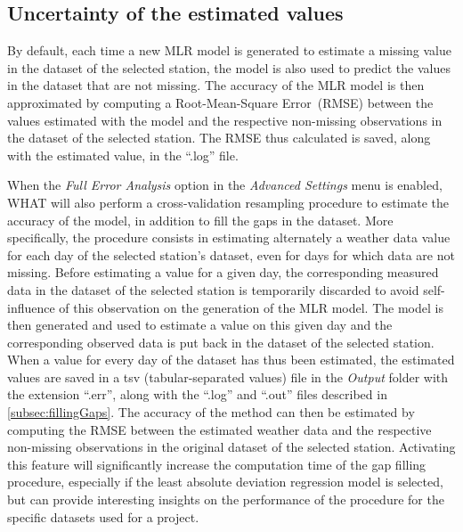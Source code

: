 \documentclass[WHATMANUAL.tex]{subfiles}
\begin{document}
\subsection{Uncertainty of the estimated values}\label{subsec:uncertainty}

By default, each time a new MLR model is generated to estimate a missing value in the dataset of the selected station, the model is also used to predict the values in the dataset that are not missing. The accuracy of the MLR model is then approximated by computing a Root-Mean-Square Error~(RMSE) between the values estimated with the model and the respective non-missing observations in the dataset of the selected station. The RMSE thus calculated is saved, along with the estimated value, in the ``.log'' file.

When the \emph{Full Error Analysis} option in the \emph{Advanced Settings} menu is enabled, WHAT will also perform a cross-validation resampling procedure to estimate the accuracy of the model, in addition to fill the gaps in the dataset. More specifically, the procedure consists in estimating alternately a weather data value for each day of the selected station's dataset, even for days for which data are not missing. Before estimating a value for a given day, the corresponding measured data in the dataset of the selected station is temporarily discarded to avoid self-influence of this observation on the generation of the MLR model. The model is then generated and used to estimate a value on this given day and the corresponding observed data is put back in the dataset of the selected station. When a value for every day of the dataset has thus been estimated, the estimated values are saved in a tsv (tabular-separated values) file in the \emph{Output} folder with the extension ``.err'', along with the ``.log'' and ``.out'' files described in \cref{subsec:fillingGaps}. The accuracy of the method can then be estimated by computing the RMSE between the estimated weather data and the respective non-missing observations in the original dataset of the selected station. Activating this feature will significantly increase the computation time of the gap filling procedure, especially if the least absolute deviation regression model is selected, but can provide interesting insights on the performance of the procedure for the specific datasets used for a project.
\end{document}
